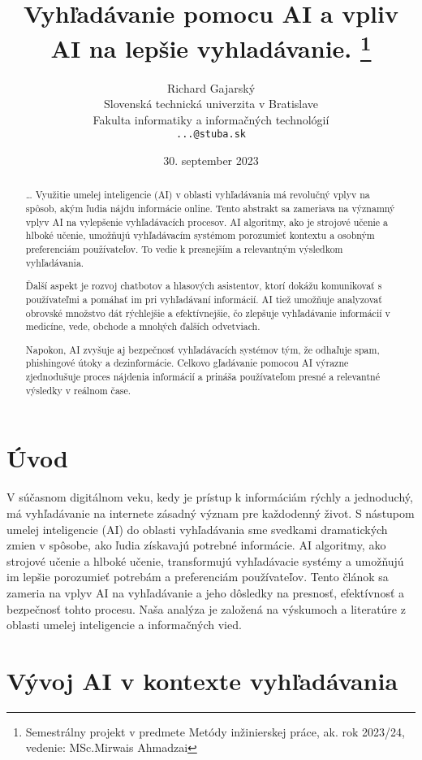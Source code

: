 \documentclass[10pt,twoside,slovak,a4paper]{article}
\title{Vyhľadávanie pomocu AI a vpliv AI na lepšie vyhladávanie. \thanks{Semestrálny projekt v predmete Metódy inžinierskej práce, ak. rok 2023/24, vedenie: MSc.Mirwais Ahmadzai}} %
\author{Richard Gajarský\\[2pt]
	{\small Slovenská technická univerzita v Bratislave}\\
	{\small Fakulta informatiky a informačných technológií}\\
	{\small \texttt{...@stuba.sk}}
	}
\date{\small 30. september 2023} %
\begin{document}
\maketitle

\begin{abstract}
\ldots 
Využitie umelej inteligencie (AI) v oblasti vyhľadávania má revolučný vplyv na spôsob, akým ľudia nájdu informácie online. Tento abstrakt sa zameriava na významný vplyv AI na vylepšenie vyhľadávacích procesov. AI algoritmy, ako je strojové učenie a hlboké učenie, umožňujú vyhľadávacím systémom porozumieť kontextu a osobným preferenciám používateľov. To vedie k presnejším a relevantným výsledkom vyhľadávania.

Ďalší aspekt je rozvoj chatbotov a hlasových asistentov, ktorí dokážu komunikovať s používateľmi a pomáhať im pri vyhľadávaní informácií. AI tiež umožňuje analyzovať obrovské množstvo dát rýchlejšie a efektívnejšie, čo zlepšuje vyhľadávanie informácií v medicíne, vede, obchode a mnohých ďalších odvetviach.

Napokon, AI zvyšuje aj bezpečnosť vyhľadávacích systémov tým, že odhaľuje spam, phishingové útoky a dezinformácie. Celkovo gľadávanie pomocou AI výrazne zjednodušuje proces nájdenia informácií a prináša používateľom presné a relevantné výsledky v reálnom čase.

\end{abstract}



\section{Úvod}

V súčasnom digitálnom veku, kedy je prístup k informáciám rýchly a jednoduchý, má vyhľadávanie na internete zásadný význam pre každodenný život. S nástupom umelej inteligencie (AI) do oblasti vyhľadávania sme svedkami dramatických zmien v spôsobe, ako ľudia získavajú potrebné informácie. AI algoritmy, ako strojové učenie a hlboké učenie, transformujú vyhľadávacie systémy a umožňujú im lepšie porozumieť potrebám a preferenciám používateľov. Tento článok sa zameria na vplyv AI na vyhľadávanie a jeho dôsledky na presnosť, efektívnosť a bezpečnosť tohto procesu. Naša analýza je založená na výskumoch a literatúre z oblasti umelej inteligencie a informačných vied.



\section{Vývoj AI v kontexte vyhľadávania}
\label{sec:vývoj-ai}
\end{document}
